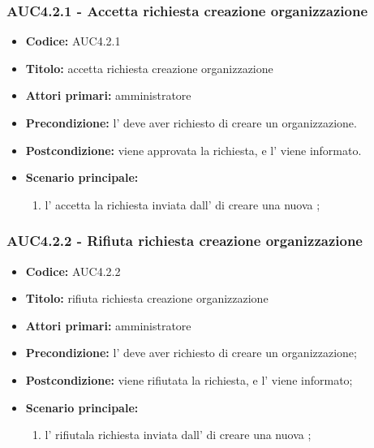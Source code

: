 \documentclass[casi-duso]{subfiles}
\begin{document}
\subsubsection{AUC4.2.1 - Accetta richiesta creazione organizzazione}%
\label{subsub:AUC4.2.1}
\begin{itemize}
  \item \textbf{Codice:} AUC4.2.1
  \item \textbf{Titolo:} accetta richiesta creazione organizzazione
  \item \textbf{Attori primari:} amministratore
  \item \textbf{Precondizione:} l' deve aver richiesto di creare un organizzazione.
  \item \textbf{Postcondizione:} viene approvata la richiesta, e l' viene informato.
  \item \textbf{Scenario principale:}
  \begin{enumerate}
    \item  l' accetta la richiesta inviata dall' di creare una nuova ;
  \end{enumerate}
\end{itemize}

\subsubsection{AUC4.2.2 - Rifiuta richiesta creazione organizzazione}%
\label{subsub:AUC4.2.2}
\begin{itemize}
  \item \textbf{Codice:} AUC4.2.2
  \item \textbf{Titolo:} rifiuta richiesta creazione organizzazione
  \item \textbf{Attori primari:} amministratore
  \item \textbf{Precondizione:} l' deve aver richiesto di creare un organizzazione;
  \item \textbf{Postcondizione:} viene rifiutata la richiesta, e l' viene informato;
  \item \textbf{Scenario principale:}
  \begin{enumerate}
    \item  l' rifiutala richiesta inviata dall' di creare una nuova ;
  \end{enumerate}
\end{itemize}
\end{document}
